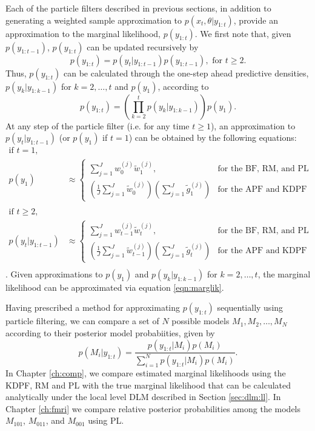 Each of the particle filters described in previous sections, in addition to generating a weighted sample approximation to $p(x_t,\theta|y_{1:t})$, provide an approximation to the marginal likelihood, $p(y_{1:t})$. We first note that, given $p(y_{1:t-1})$, $p(y_{1:t})$ can be updated recursively by
\begin{equation}
p(y_{1:t}) = p(y_t|y_{1:t-1})p(y_{1:t-1}), \mbox{ for } t \ge 2. \label{eqn:marglik:recurse}
\end{equation}
Thus, $p(y_{1:t})$ can be calculated through the one-step ahead predictive densities, $p(y_k|y_{1:k-1})$ for $k=2,\ldots,t$ and $p(y_1)$, according to
\begin{equation}
p(y_{1:t}) = \left(\prod_{k=2}^t p(y_k|y_{1:k-1})\right)p(y_1). \label{eqn:marglik}
\end{equation}
At any step of the particle filter (i.e. for any time $t \ge 1$), an approximation to $p(y_t|y_{1:t-1})$ (or $p(y_1)$ if $t = 1$) can be obtained by the following equations:
\begin{align}
\mbox{if } t = 1, & \nonumber \\
p(y_1) &\approx \left\{\begin{array}{ll} \sum_{j=1}^J w^{(j)}_{0}\tilde{w}^{(j)}_1, & \mbox{for the BF, RM, and PL} \\ \left(\frac{1}{J}\sum_{j=1}^J \tilde{w}^{(j)}_{0}\right)\left(\sum_{j=1}^J\tilde{g}^{(j)}_1\right) & \mbox{for the APF and KDPF} \end{array} \right. \label{eqn:onestep:pf:init} \\
 & \nonumber \\
\mbox{if } t \ge 2, & \nonumber \\
p(y_t|y_{1:t-1}) &\approx \left\{\begin{array}{ll} \sum_{j=1}^J w^{(j)}_{t-1}\tilde{w}^{(j)}_t, & \mbox{for the BF, RM, and PL} \\ \left(\frac{1}{J}\sum_{j=1}^J \tilde{w}^{(j)}_{t-1}\right)\left(\sum_{j=1}^J\tilde{g}^{(j)}_t\right) & \mbox{for the APF and KDPF} \end{array} \right. \label{eqn:onestep:pf} \\
 & \nonumber
\end{align}
\cite[Section 4.2][]{douc:joh:tut:2009}. Given approximations to $p(y_1)$ and $p(y_k|y_{1:k-1})$ for $k = 2,\ldots,t$, the marginal likelihood can be approximated via equation \eqref{eqn:marglik}.

Having prescribed a method for approximating $p(y_{1:t})$ sequentially using particle filtering, we can compare a set of $N$ possible models ${M_1,M_2,\ldots,M_N}$ according to their posterior model probabiities, given by
\begin{equation}
p(M_i|y_{1:t}) = \frac{p(y_{1:t}|M_i)p(M_i)}{\sum_{i=1}^N p(y_{1:t}|M_i)p(M_i)}. \label{eqn:modelcomp}
\end{equation}
In Chapter \ref{ch:comp}, we compare estimated marginal likelihoods using the KDPF, RM and PL with the true marginal likelihood that can be calculated analytically under the local level DLM described in Section \ref{sec:dlm:ll}. In Chapter \ref{ch:fmri} we compare relative posterior probabilities among the models $M_{101}$, $M_{011}$, and $M_{001}$ using PL.

